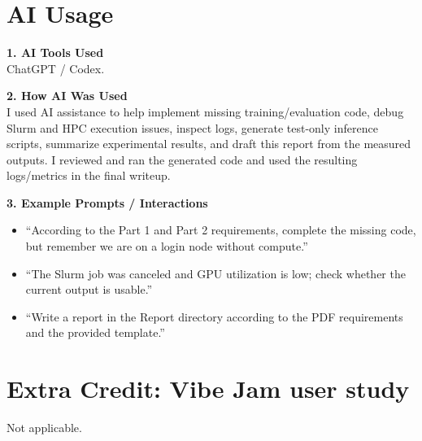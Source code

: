 \documentclass{article}
\begin{document}
\section*{AI Usage}

\noindent\textbf{1. AI Tools Used} \\
ChatGPT / Codex.

\noindent\textbf{2. How AI Was Used} \\
I used AI assistance to help implement missing training/evaluation code, debug Slurm and HPC execution issues, inspect logs, generate test-only inference scripts, summarize experimental results, and draft this report from the measured outputs. I reviewed and ran the generated code and used the resulting logs/metrics in the final writeup.

\noindent\textbf{3. Example Prompts / Interactions} \\
\begin{itemize}
\item ``According to the Part 1 and Part 2 requirements, complete the missing code, but remember we are on a login node without compute.''
\item ``The Slurm job was canceled and GPU utilization is low; check whether the current output is usable.''
\item ``Write a report in the Report directory according to the PDF requirements and the provided template.''
\end{itemize}

\section*{Extra Credit: Vibe Jam user study}
Not applicable.
\end{document}
